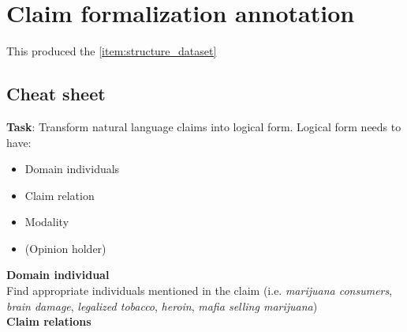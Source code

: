 \section{Claim formalization annotation}
\label{sec:formalization_annotation}

This produced the \ref{item:structure_dataset}

\subsection{Cheat sheet}

\textbf{Task}: Transform natural language claims into logical form. Logical form needs to have:
\begin{itemize}
\item Domain individuals 
\item Claim relation
\item Modality
\item (Opinion holder)
\end{itemize}

\noindent \textbf{Domain individual} \\
Find appropriate individuals mentioned in the claim (i.e. \textit{marijuana consumers},
\textit{brain damage}, \textit{legalized tobacco}, \textit{heroin}, \textit{mafia selling marijuana}) \\

\noindent \textbf{Claim relations} \\

